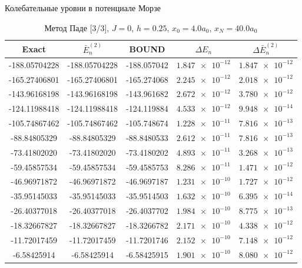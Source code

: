 \documentclass[10pt,pdf,hyperref={unicode},xcolor=dvipsnames]{beamer}
\begin{document}
\begin{frame}{Колебательные уровни в потенциале Морзе}
    \begin{block}{}
        \begin{table}[H]
            \vspace*{-0.75cm}
            \caption{Метод Паде [3/3], $J = 0$, $h = 0.25$, $x_0 = 4.0 a_0$, $x_N = 40.0 a_0$}
            \vspace*{-0.25cm}
            \begin{tabular}{ccccc}
             \toprule
             Exact & $\bar{E}_n^{(2)}$ & BOUND & $\Delta E_n$ & $\Delta \bar{E}_n^{(2)}$ \\
             \midrule
                -188.05704228 & -188.05704228 & -188.057042 & $\num{1.847e-12}$ & $\num{1.847e-12}$ \\
                -165.27406801 & -165.27406801 & -165.274068 & $\num{2.245e-12}$ & $\num{2.018e-12}$ \\
                -143.96168198 & -143.96168198 & -143.961682 & $\num{2.672e-12}$ & $\num{3.780e-12}$ \\
                -124.11988418 & -124.11988418 & -124.119884 & $\num{4.533e-12}$ & $\num{9.948e-14}$ \\
                -105.74867462 & -105.74867462 & -105.748674 & $\num{1.228e-11}$ & $\num{7.816e-13}$ \\
                -88.84805329  & -88.84805329  & -88.8480533 & $\num{2.612e-11}$ & $\num{7.816e-13}$ \\
                -73.41802020  & -73.41802020  & -73.4180202 & $\num{4.893e-11}$ & $\num{3.268e-13}$ \\ 
                -59.45857534  & -59.45857534  & -59.4585753 & $\num{8.286e-11}$ & $\num{1.471e-12}$ \\ 
                -46.96971872  & -46.96971872  & -46.9697187 & $\num{1.231e-10}$ & $\num{1.727e-12}$ \\
                -35.95145033  & -35.95145033  & -35.9514503 & $\num{1.632e-10}$ & $\num{6.395e-14}$ \\
                -26.40377018  & -26.40377018  & -26.4037702 & $\num{1.984e-10}$ & $\num{8.775e-13}$ \\
                -18.32667827  & -18.32667827  & -18.3266782 & $\num{2.171e-10}$ & $\num{4.338e-12}$ \\
                -11.72017459  & -11.72017459  & -11.7201746 & $\num{2.152e-10}$ & $\num{7.148e-12}$ \\ 
                -6.58425914   & -6.58425914   & -6.58425915 & $\num{1.901e-10}$ & $\num{8.080e-12}$ \\

\end{tabular}
\end{table}
\end{block}
\end{frame}
\end{document}
